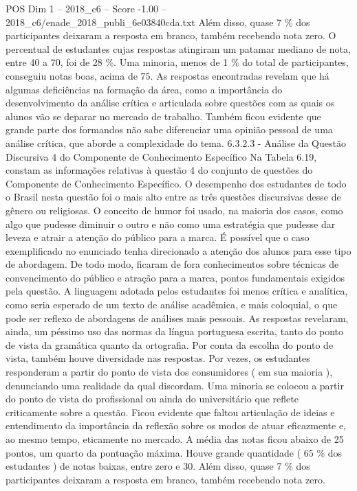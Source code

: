 \begin{textsample}{POS Dim 1 – 2018\_c6 – Score -1.00 – 2018\_c6/enade\_2018\_publi\_6e03840cda.txt}
Além disso, quase 7 \% dos participantes deixaram a resposta em branco, também recebendo nota zero.
O percentual de estudantes cujas respostas atingiram um patamar mediano de nota, entre 40 a 70, foi de 28 \%.
Uma minoria, menos de 1 \% do total de participantes, conseguiu notas boas, acima de 75.
As respostas encontradas revelam que há algumas deficiências na formação da área, como a importância do desenvolvimento da análise crítica e articulada sobre questões com as quais os alunos vão se deparar no mercado de trabalho.
Também ficou evidente que grande parte dos formandos não sabe diferenciar uma opinião pessoal de uma análise crítica, que aborde a complexidade do tema. 6.3.2.3 - Análise da Questão Discursiva 4 do Componente de Conhecimento Específico Na Tabela 6.19, constam as informações relativas à questão 4 do conjunto de questões do Componente de Conhecimento Específico.
O desempenho dos estudantes de todo o Brasil nesta questão foi o mais alto entre as três questões discursivas desse de gênero ou religiosas.
O conceito de humor foi usado, na maioria dos casos, como algo que pudesse diminuir o outro e não como uma estratégia que pudesse dar leveza e atrair a atenção do público para a marca.
É possível que o caso exemplificado no enunciado tenha direcionado a atenção dos alunos para esse tipo de abordagem.
De todo modo, ficaram de fora conhecimentos sobre técnicas de convencimento do público e atração para a marca, pontos fundamentais exigidos pela questão.
A linguagem adotada pelos estudantes foi menos crítica e analítica, como seria esperado de um texto de análise acadêmica, e mais coloquial, o que pode ser reflexo de abordagens de análises mais pessoais.
As respostas revelaram, ainda, um péssimo uso das normas da língua portuguesa escrita, tanto do ponto de vista da gramática quanto da ortografia.
Por conta da escolha do ponto de vista, também houve diversidade nas respostas.
Por vezes, os estudantes responderam a partir do ponto de vista dos consumidores ( em sua maioria ), denunciando uma realidade da qual discordam.
Uma minoria se colocou a partir do ponto de vista do profissional ou ainda do universitário que reflete criticamente sobre a questão.
Ficou evidente que faltou articulação de ideias e entendimento da importância da reflexão sobre os modos de atuar eficazmente e, ao mesmo tempo, eticamente no mercado.
A média das notas ficou abaixo de 25 pontos, um quarto da pontuação máxima.
Houve grande quantidade ( 65 \% dos estudantes ) de notas baixas, entre zero e 30.
Além disso, quase 7 \% dos participantes deixaram a resposta em branco, também recebendo nota zero.

\end{textsample}
